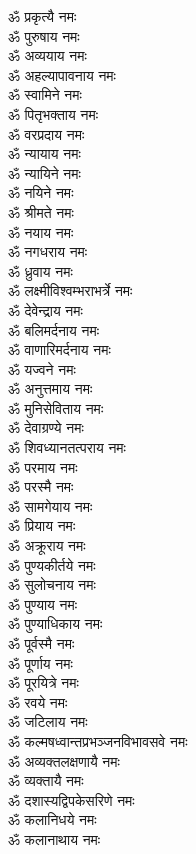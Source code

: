 \begin{multicols}{2}
\begin{flushleft}
ॐ प्रकृत्यै नमः\\
ॐ पुरुषाय नमः\\
ॐ अव्ययाय नमः\\
ॐ अहल्यापावनाय नमः\\
ॐ स्वामिने नमः\hfill{}\\
ॐ पितृभक्ताय नमः\\
ॐ वरप्रदाय नमः\\
ॐ न्यायाय नमः\\
ॐ न्यायिने नमः\\
ॐ नयिने नमः\\
ॐ श्रीमते नमः\\
ॐ नयाय नमः\\
ॐ नगधराय नमः\\
ॐ ध्रुवाय नमः\\
ॐ लक्ष्मीविश्वम्भराभर्त्रे नमः\hfill{}\\
ॐ देवेन्द्राय नमः\\
ॐ बलिमर्दनाय नमः\\
ॐ वाणारिमर्दनाय नमः\\
ॐ यज्वने नमः\\
ॐ अनुत्तमाय नमः\\
ॐ मुनिसेविताय नमः\\
ॐ देवाग्रण्ये नमः\\
ॐ शिवध्यानतत्पराय नमः\\
ॐ परमाय नमः\\
ॐ परस्मै नमः\hfill{}\\
ॐ सामगेयाय नमः\\
ॐ प्रियाय नमः\\
ॐ अक्रूराय नमः\\
ॐ पुण्यकीर्तये नमः\\
ॐ सुलोचनाय नमः\\
ॐ पुण्याय नमः\\
ॐ पुण्याधिकाय नमः\\
ॐ पूर्वस्मै नमः\\
ॐ पूर्णाय नमः\\
ॐ पूरयित्रे नमः\hfill{}\\
ॐ रवये नमः\\
ॐ जटिलाय नमः\\
ॐ कल्मषध्वान्तप्रभञ्जनविभावसवे नमः\\
ॐ अव्यक्तलक्षणायै नमः\\
ॐ व्यक्तायै नमः\\
ॐ दशास्यद्विपकेसरिणे नमः\\
ॐ कलानिधये नमः\\
ॐ कलानाथाय नमः\\

\end{flushleft}
\end{multicols}
